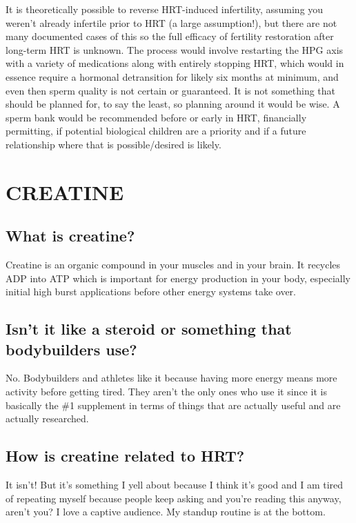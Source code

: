 \documentclass{article}
\begin{document}
It is theoretically possible to reverse HRT-induced infertility, assuming you weren't already infertile prior to HRT (a large assumption!), but there are not many documented cases of this so the full efficacy of fertility restoration after long-term HRT is unknown. The process would involve restarting the HPG axis with a variety of medications along with entirely stopping HRT, which would in essence require a hormonal detransition for likely six months at minimum, and even then sperm quality is not certain or guaranteed. It is not something that should be planned for, to say the least, so planning around it would be wise. A sperm bank would be recommended before or early in HRT, financially permitting, if potential biological children are a priority and if a future relationship where that is possible/desired is likely.



\section{CREATINE}

\subsection{What is creatine?}

Creatine is an organic compound in your muscles and in your brain. It recycles ADP into ATP which is important for energy production in your body, especially initial high burst applications before other energy systems take over.

\subsection{Isn’t it like a steroid or something that bodybuilders use?}

No. Bodybuilders and athletes like it because having more energy means more activity before getting tired. They aren’t the only ones who use it since it is basically the \#1 supplement in terms of things that are actually useful and are actually researched. 

\subsection{How is creatine related to HRT?}

It isn’t! But it’s something I yell about because I think it’s good and I am tired of repeating myself because people keep asking and you’re reading this anyway, aren’t you? I love a captive audience. My standup routine is at the bottom.
\end{document}
